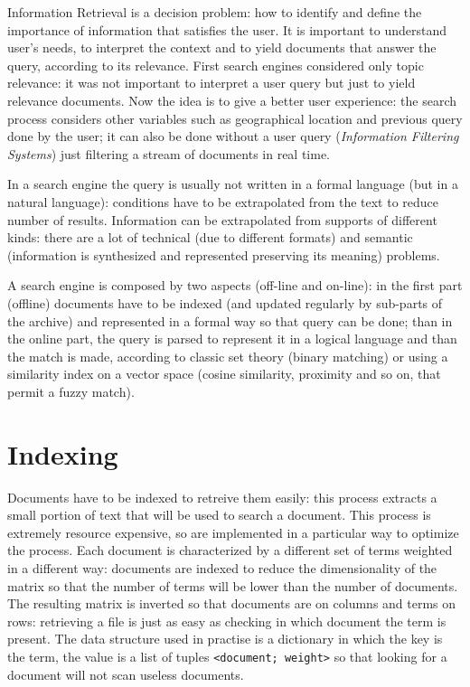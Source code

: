 \documentclass[11pt, a4page]{article}
\begin{document}
Information Retrieval is a decision problem: how to identify and define the importance of information that satisfies the user.
It is important to understand user's needs, to interpret the context and to yield documents that answer the query, according to its relevance.
First search engines considered only topic relevance: it was not important to interpret a user query but just to yield relevance documents.
Now the idea is to give a better user experience: the search process considers other variables such as geographical location and previous query done by the user; it can also be done without a user query (\textit{Information Filtering Systems}) just filtering a stream of documents in real time.

In a search engine the query is usually not written in a formal language (but in a natural language): conditions have to be extrapolated from the text to reduce number of results.
Information can be extrapolated from supports of different kinds: there are a lot of technical (due to different formats) and semantic (information is synthesized and represented preserving its meaning) problems.

A search engine is composed by two aspects (off-line and on-line): in the first part (offline) documents have to be indexed (and updated regularly by sub-parts of the archive) and represented in a formal way so that query can be done; than in the online part, the query is parsed to represent it in a logical language and than the match is made, according to classic set theory (binary matching) or using a similarity index on a vector space (cosine similarity, proximity and so on, that permit a fuzzy match).

\section{Indexing}
Documents have to be indexed to retreive them easily: this process extracts a small portion of text that will be used to search a document.
This process is extremely resource expensive, so are implemented in a particular way to optimize the process.
Each document is characterized by a different set of terms weighted in a different way: documents are indexed to reduce the dimensionality of the matrix so that the number of terms will be lower than the number of documents.
The resulting matrix is inverted so that documents are on columns and terms on rows: retrieving a file is just as easy as checking in which document the term is present.
The data structure used in practise is a dictionary in which the key is the term, the value is a list of tuples \verb|<document; weight>| so that looking for a document will not scan useless documents.
\end{document}
